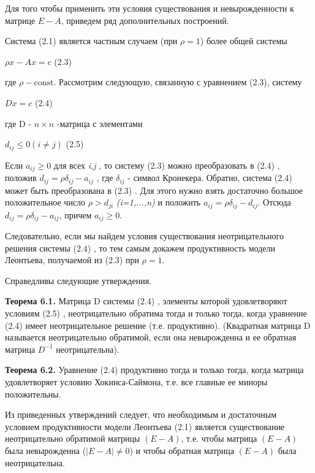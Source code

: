 \documentclass[12pt, 4paper]{book}
\begin{document}
{Для того чтобы применить эти условия существования и невырожденности к матрице $E-A$, приведем ряд дополнительных построений.
\par

Система (2.1) является частным случаем (при $\rho =1$) более общей системы
\begin{center}
$\rho x -Ax =c$ (2.3)
\end{center}
где $\rho - \text{const}$. Рассмотрим следующую, связанную с уравнением (2.3), систему
\begin{center}
$Dx = c$ (2.4)
\end{center}
где D - $n \times n$ -матрица с элементами
\begin{center}
$d_{ij} \leq 0 (i \neq j)$ (2.5)
\end{center}
\par

Если $a_{ij} \geq 0$ для всех \textit{i,j} , то систему (2.3) можно преобразовать в (2.4) , положив $d_{ij} = \rho \delta_{ij} - a_{ij}$ , где $\delta_{ij}$ - символ Кронекера. Обратно, система (2.4) может быть преобразована в (2.3) . Для этого нужно взять достаточно большое положительное число $\rho > d_{ji}$ \textit{(i=1,...,n)} и положить $a_{ij} = \rho \delta_{ij} - d_{ij}$. Отсюда $d_{ij} = \rho \delta_{ij}-a_{ij}$, причем $a_{ij} \geq 0$.
\par

Следовательно, если мы найдем условия существования неотрицательного решения системы (2.4) , то тем самым докажем продуктивность модели Леонтьева, получаемой из (2.3) при $\rho =1$.
\par

Справедливы следующие утверждения.
\par

\textbf{Теорема 6.1.}
Матрица D системы (2.4) , элементы которой удовлетворяют условиям (2.5) , неотрицательно обратима тогда и только тогда, когда уравнение (2.4) имеет неотрицательное решение (т.е. продуктивно).
(Квадратная матрица D называется неотрицательно обратимой, если она невырожденна и ее обратная матрица $D^{-1}$ неотрицательна).
\par

\textbf{Теорема 6.2.} Уравнение (2.4) продуктивно тогда и только тогда, когда матрица удовлетворяет условию Хокинса-Саймона, т.е. все главные ее миноры положительны. 
\par

Из приведенных утверждений следует, что необходимым и достаточным условием продуктивности модели Леонтьева (2.1) является существование неотрицательно обратимой матрицы $(E-A)$, т.е. чтобы матрица $(E-A)$ была невырожденна ($\left|E-A\right| \neq 0$) и чтобы обратная матрица $(E-A)$ была неотрицательна.
\par

}
\end{document}
